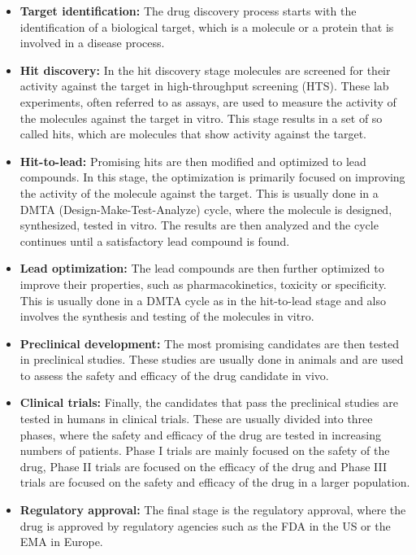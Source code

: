 \begin{itemize}
      \item \textbf{Target identification:} The drug discovery process starts with the identification
            of a biological target, which is a molecule or a protein that is involved in a disease
            process.
      \item \textbf{Hit discovery:} In the hit discovery stage molecules are screened for their
            activity against the target in high-throughput screening (HTS). These lab experiments, often
            referred to as assays, are used to measure the activity of the molecules against the target in
            vitro. This stage results in a set of so called hits, which are molecules that show activity
            against the target.
      \item \textbf{Hit-to-lead:} Promising hits are then modified and optimized to lead compounds. In
            this stage, the optimization is primarily focused on improving the activity of the molecule
            against the target. This is usually done in a DMTA (Design-Make-Test-Analyze) cycle, where the
            molecule is designed, synthesized, tested in vitro. The results are then analyzed and the cycle
            continues until a satisfactory lead compound is found.
      \item \textbf{Lead optimization:} The lead compounds are then further optimized to improve their
            properties, such as pharmacokinetics, toxicity or specificity. This is usually done in a DMTA
            cycle as in the hit-to-lead stage and also involves the synthesis and testing of the molecules
            in vitro.
      \item \textbf{Preclinical development:} The most promising candidates are then tested in
            preclinical studies. These studies are usually done in animals and are used to assess the safety
            and efficacy of the drug candidate in vivo.
      \item \textbf{Clinical trials:} Finally, the candidates that pass the preclinical studies are
            tested in humans in clinical trials. These are usually divided into three phases, where the
            safety and efficacy of the drug are tested in increasing numbers of patients. Phase I trials are
            mainly focused on the safety of the drug, Phase II trials are focused on the efficacy of the
            drug and Phase III trials are focused on the safety and efficacy of the drug in a larger
            population.
      \item \textbf{Regulatory approval:} The final stage is the regulatory approval, where the drug
            is approved by regulatory agencies such as the FDA in the US or the EMA in Europe.
\end{itemize}

